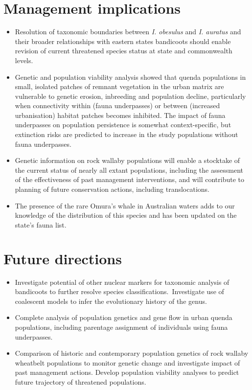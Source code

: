 \documentclass[version=last, paper=a4, DIV=18, usenames, dvipsnames]{scrartcl}
\begin{document}
\section*{Management implications}
\begin{itemize}
\itemsep1pt\parskip0pt
\item
  Resolution of taxonomic boundaries between \emph{I. obesulus} and
  \emph{I. auratus} and their broader relationships with eastern states
  bandicoots should enable revision of current threatened species status
  at state and commonwealth levels.
\item
  Genetic and population viability analysis showed that quenda
  populations in small, isolated patches of remnant vegetation in the
  urban matrix are vulnerable to genetic erosion, inbreeding and
  population decline, particularly when connectivity within (fauna
  underpasses) or between (increased urbanisation) habitat patches
  becomes inhibited. The impact of fauna underpasses on population
  persistence is somewhat context-specific, but extinction risks are
  predicted to increase in the study populations without fauna
  underpasses.
\item
  Genetic information on rock wallaby populations will enable a
  stocktake of the current status of nearly all extant populations,
  including the assessment of the effectiveness of past management
  interventions, and will contribute to planning of future conservation
  actions, including translocations. ~
\item
  The presence of the rare Omura's whale in Australian waters adds to
  our knowledge of the distribution of this species and has been updated
  on the state's fauna list.
\end{itemize}



\section*{Future directions}
\begin{itemize}
\itemsep1pt\parskip0pt
\item
  Investigate potential of other nuclear markers for taxonomic analysis
  of bandicoots to further resolve species classifications.~Investigate
  use of coalescent models to infer the evolutionary history of the
  genus.
\item
  Complete analysis of population genetics and gene flow in urban quenda
  populations, including parentage assignment of individuals using fauna
  underpasses.
\item
  Comparison of historic and contemporary population genetics of rock
  wallaby wheatbelt populations to monitor genetic change and
  investigate impact of past management actions. Develop population
  viability analyses to predict future trajectory of threatened
  populations.
\end{itemize}




\clearpage
\end{document}
